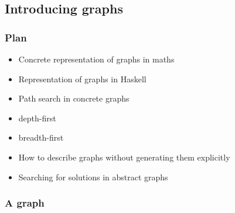 \subsection{Introducing graphs}

\begin{frame}[fragile]\frametitle{Plan}

\begin{itemize}
\item Concrete representation of graphs in maths
\item Representation of graphs in Haskell
\item Path search in concrete graphs
\end{itemize}

\begin{itemize}
\item depth-first
\item breadth-first
\end{itemize}

\begin{itemize}
\item How to describe graphs without generating them explicitly
\item Searching for solutions in abstract graphs
\end{itemize}

\end{frame}

\begin{frame}[fragile]\frametitle{A graph}



\end{frame}


